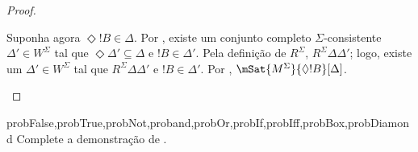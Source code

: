 \documentclass[../../../include/open-logic-section]{subfiles}
\begin{document}
\begin{proof}
\begin{enumerate}
{{{          Suponha agora $\Diamond !B \in \Delta$. Por
          , existe um conjunto completo
          $\Sigma$-consistente $\Delta' \in W^\Sigma$ tal que
          $\Diamond \Delta' \subseteq \Delta$ e $!B \in
          \Delta'$. Pela
          definição de $R^\Sigma$, $R^\Sigma \Delta\Delta'$; logo,
          existe um $\Delta' \in W^\Sigma$ tal que $R^\Sigma
          \Delta\Delta'$ e $!B \in \Delta'$. Por
          , $\mSat{M^\Sigma}{\Diamond
            !B}[\Delta]$.}}}{}
  \end{enumerate}
\end{proof}

\begin{probtag}{probFalse,probTrue,probNot,proband,probOr,probIf,probIff,probBox,probDiamond}
  Complete a demonstração de .
\end{probtag}
\end{document}
